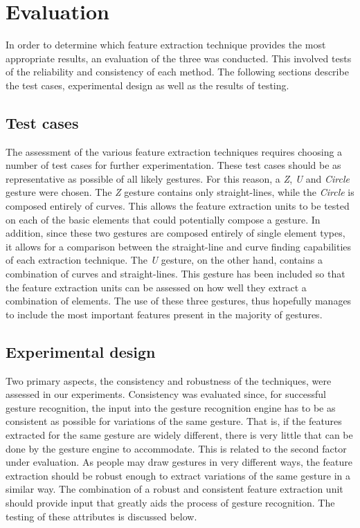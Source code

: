 \section{Evaluation}
In order to determine which feature extraction technique provides the most appropriate results, an evaluation of the three was conducted. This involved tests of the reliability and consistency of each method. The following sections describe the test cases, experimental design as well as the results of testing.

\subsection{Test cases}
The assessment of the various feature extraction techniques requires choosing a number of test cases for further experimentation. These test cases should be as representative as possible of all likely gestures. For this reason, a \emph{Z}, \emph{U} and \emph{Circle} gesture were chosen. The \emph{Z} gesture contains only straight-lines, while the \emph{Circle} is composed entirely of curves. This allows the feature extraction units to be tested on each of the basic elements that could potentially compose a gesture. In addition, since these two gestures are composed entirely of single element types, it allows for a comparison between the straight-line and curve finding capabilities of each extraction technique. The \emph{U} gesture, on the other hand, contains a combination of curves and straight-lines. This gesture has been included so that the feature extraction units can be assessed on how well they extract a combination of elements. The use of these three gestures, thus hopefully manages to include the most important features present in the majority of gestures.

\subsection{Experimental design}
Two primary aspects, the consistency and robustness of the techniques, were assessed in our experiments. Consistency was evaluated since, for successful gesture recognition, the input into the gesture recognition engine has to be as consistent as possible for variations of the same gesture. That is, if the features extracted for the same gesture are widely different, there is very little that can be done by the gesture engine to accommodate. This is related to the second factor under evaluation. As people may draw gestures in very different ways, the feature extraction should be robust enough to extract variations of the same gesture in a similar way. The combination of a robust and consistent feature extraction unit should provide input that greatly aids the process of gesture recognition. The testing of these attributes is discussed below.

